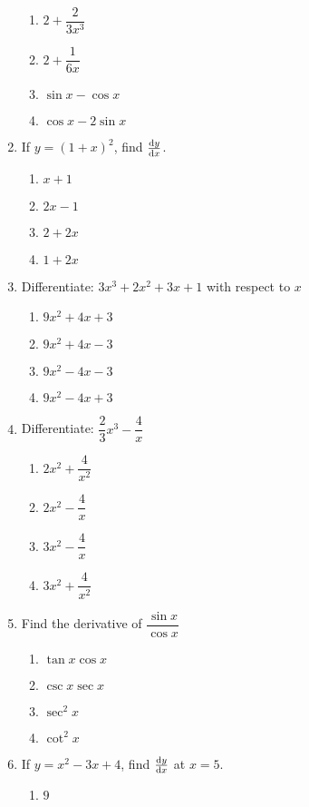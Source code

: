 \begin{multicols}{2}
\begin{enumerate}[label={\arabic*.}]
	\begin{enumerate}[label={\Alph*.}]
	\item \(2 + \dfrac{2}{3{x}^{3}}\)
	\item \(2 + \dfrac{1}{6x}\)
	\item \(\sin x - \cos x\)
	\item \(\cos x - 2\sin x\)
	\end{enumerate}
\item If \(y = (1+x)^{2}\), find \( \dv{y}{x} \).
	\begin{enumerate}[label={\Alph*.}]
	\item \(x+1\)
	\item \(2x-1\)
	\item \(2 + 2x\)
	\item \(1+2x\)
	\end{enumerate}
\item Differentiate: \(3{x}^{3}+2{x}^{2}+3x+1\) with respect to \(x\)
	\begin{enumerate}[label={\Alph*.}]
	\item \(9{x}^{2}+4x+3\)
	\item \(9{x}^{2}+4x-3\)
	\item \(9{x}^{2}-4x-3\)
	\item \(9{x}^{2}-4x+3\)
	\end{enumerate}
\item Differentiate: \(\dfrac{2}{3}x^{3}-\dfrac{4}{x}\)
	\begin{enumerate}[label={\Alph*.}]
	\item \(2{x}^{2} + \dfrac{4}{{x}^{2}}\)
	\item \(2x^{2}-\dfrac{4}{x}\)
	\item \(3x^{2}-\dfrac{4}{x}\)
	\item \(3x^{2}+\dfrac{4}{{x}^{2}}\)
	\end{enumerate}
\item Find the derivative of \(\dfrac{\sin {x}}{\cos {x}}\)
	\begin{enumerate}[label={\Alph*.}]
	\item \(\tan{x}\cos{x}\)
	\item \(\csc{x}\sec{x}\)
	\item \(\sec^{2}{x}\)
	\item \(\cot^{2}{x}\)
	\end{enumerate}
\item If \(y={x}^{2}-3x+4\), find \(\dv{y}{x}\) at \(x=5\).
	\begin{enumerate}[label={\Alph*.}]
	\item \(9\)

\end{enumerate}
\end{enumerate}
\end{multicols}
